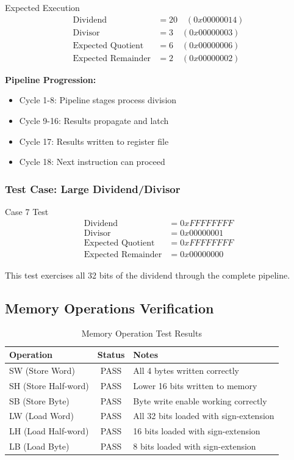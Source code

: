 \documentclass[a4paper, 11pt]{article}
\begin{document}
\begin{myblock}{Expected Execution}
\begin{align}
\text{Dividend} &= 20 \quad (0x00000014) \\
\text{Divisor} &= 3 \quad (0x00000003) \\
\text{Expected Quotient} &= 6 \quad (0x00000006) \\
\text{Expected Remainder} &= 2 \quad (0x00000002)
\end{align}

\textbf{Pipeline Progression:}
\begin{itemize}
    \item Cycle 1-8: Pipeline stages process division
    \item Cycle 9-16: Results propagate and latch
    \item Cycle 17: Results written to register file
    \item Cycle 18: Next instruction can proceed
\end{itemize}
\end{myblock}

\subsubsection{Test Case: Large Dividend/Divisor}

\begin{myblock}{Case 7 Test}
\begin{align}
\text{Dividend} &= 0xFFFFFFFF \\
\text{Divisor} &= 0x00000001 \\
\text{Expected Quotient} &= 0xFFFFFFFF \\
\text{Expected Remainder} &= 0x00000000
\end{align}

This test exercises all 32 bits of the dividend through the complete pipeline.
\end{myblock}

\subsection{Memory Operations Verification}

\begin{table}[H]
\centering
\caption{Memory Operation Test Results}
\begin{tabular}{|l|c|l|}
\hline
\textbf{Operation} & \textbf{Status} & \textbf{Notes} \\
\hline
SW (Store Word) & PASS & All 4 bytes written correctly \\
\hline
SH (Store Half-word) & PASS & Lower 16 bits written to memory \\
\hline
SB (Store Byte) & PASS & Byte write enable working correctly \\
\hline
LW (Load Word) & PASS & All 32 bits loaded with sign-extension \\
\hline
LH (Load Half-word) & PASS & 16 bits loaded with sign-extension \\
\hline
LB (Load Byte) & PASS & 8 bits loaded with sign-extension \\
\hline
\end{tabular}
\end{table}
\end{document}
